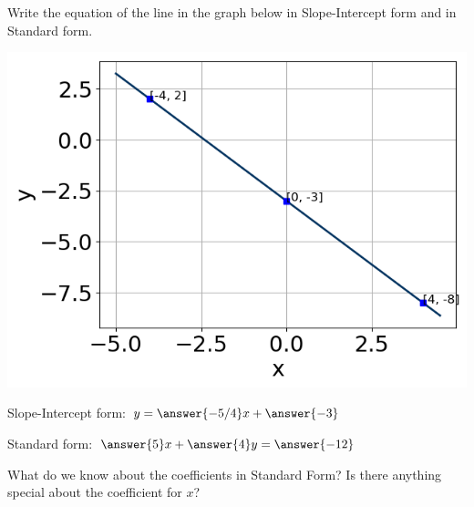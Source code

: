 \documentclass{ximera}
\begin{document}
\begin{question}
Write the equation of the line in the graph below in Slope-Intercept form and in Standard form. 

\includegraphics[scale=0.5]{question2.png}

Slope-Intercept form: $y = \answer{-5/4}x + \answer{-3}$

Standard form: $\answer{5} x + \answer{4} y = \answer{-12}$

\begin{hint}
	What do we know about the coefficients in Standard Form? Is there anything special about the coefficient for $x$?
\end{hint}
\end{question}
\end{document}
